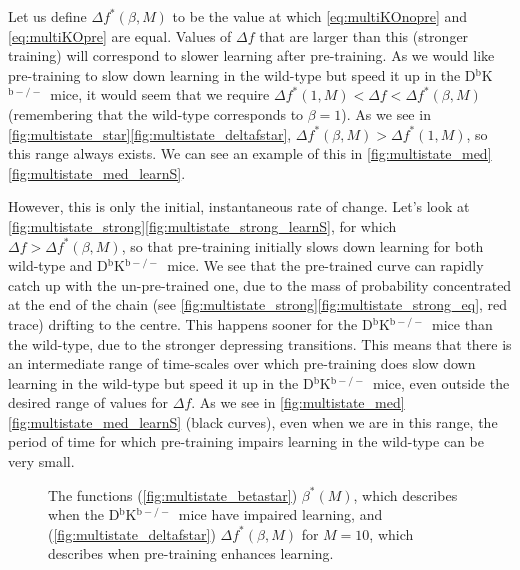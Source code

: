 \documentclass[12pt]{article}
\newcommand{\KO}{D$^\mathrm{b}$K$^{\mathrm{b}-/-}$}
\begin{document}
Let us define $\Delta f^*(\beta,M)$ to be the value at which \eqref{eq:multiKOnopre} and \eqref{eq:multiKOpre} are equal.
Values of $\Delta f$ that are larger than this (stronger training) will correspond to slower learning after pre-training.
As we would like pre-training to slow down learning in the wild-type but speed it up in the \KO\ mice, it would seem that we require $\Delta f^*(1,M) < \Delta f < \Delta f^*(\beta,M)$ (remembering that the wild-type corresponds to $\beta=1$).
As we see in \autoref{fig:multistate_star}\ref{fig:multistate_deltafstar}, $\Delta f^*(\beta,M) > \Delta f^*(1,M)$, so this range always exists.
We can see an example of this in \autoref{fig:multistate_med}\ref{fig:multistate_med_learnS}.

However, this is only the initial, instantaneous rate of change.
Let's look at \autoref{fig:multistate_strong}\ref{fig:multistate_strong_learnS}, for which $\Delta f > \Delta f^*(\beta,M)$, so that pre-training initially slows down learning for both wild-type and \KO\ mice.
We see that the pre-trained curve can rapidly catch up with the un-pre-trained one, due to the mass of probability concentrated at the end of the chain (see \autoref{fig:multistate_strong}\ref{fig:multistate_strong_eq}, red trace) drifting to the centre.
This happens sooner for the \KO\ mice than the wild-type, due to the stronger depressing transitions.
This means that there is an intermediate range of time-scales over which pre-training does slow down learning in the wild-type but speed it up in the \KO\ mice, even outside the desired range of values for $\Delta f$.
As we see in \autoref{fig:multistate_med}\ref{fig:multistate_med_learnS} (black curves), even when we are in this range, the period of time for which pre-training impairs learning in the wild-type can be very small.

\begin{figure}
 \begin{center}
 \begin{myenuma}
  \item{}\label{fig:multistate_betastar}
  \item{}\label{fig:multistate_deltafstar}
 \end{myenuma}
 \end{center}
  \caption[The functions $\beta^*(M)$ and $\Delta f^*(\beta,M)$]{The functions (\ref{fig:multistate_betastar}) $\beta^*(M)$, which describes when the \KO\ mice have impaired learning, and (\ref{fig:multistate_deltafstar}) $\Delta f^*(\beta,M)$ for $M=10$, which describes when pre-training enhances learning.}\label{fig:multistate_star}
\end{figure}
\end{document}
